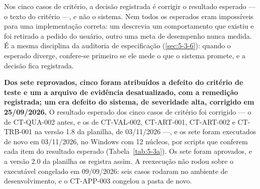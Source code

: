 Nos cinco casos de critério, a decisão registrada é corrigir o resultado esperado --- o texto do critério ---, e não o sistema. Nem todos os esperados eram impossíveis para uma implementação correta: um descrevia um comportamento que existiu e foi retirado a pedido do usuário, outro uma meta de desempenho nunca medida. É a mesma disciplina da auditoria de especificação (\ref{sec:5-3-6}): quando o esperado diverge, confere-se primeiro se ele mede o que o sistema promete, e a decisão fica registrada.

\textbf{Dos sete reprovados, cinco foram atribuídos a defeito do critério de teste e um a arquivo de evidência desatualizado, com a remedição registrada; um era defeito do sistema, de severidade alta, corrigido em 25/09/2026.} O resultado esperado dos cinco casos de critério foi corrigido --- o de CT-QUA-002 antes, e os de CT-VAL-002, CT-ART-001, CT-ART-002 e CT-TRB-001 na versão 1.8 da planilha, de 03/11/2026 ---, e os sete foram executados de novo em 03/11/2026, no Windows com 12 núcleos, por scripts que conferem cada item do resultado esperado (Tabela~\ref{tab:5-3a}). Os sete foram aprovados, e a versão 2.0 da planilha os registra assim. A reexecução não rodou sobre o executável congelado em 09/09/2026: seis casos rodaram no ambiente de desenvolvimento, e o CT-APP-003 congelou a pasta de novo.

